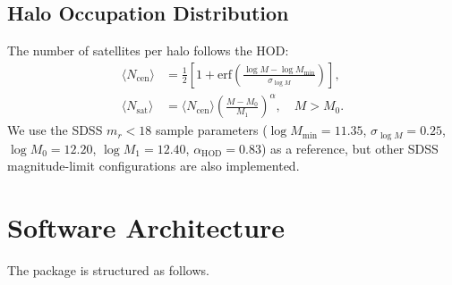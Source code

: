 \documentclass[12pt,a4paper]{article}
\begin{document}
\subsection{Halo Occupation Distribution}

The number of satellites per halo follows the \citet{Zheng2007} HOD:
\begin{align}
  \langle N_\mathrm{cen}\rangle &= \frac{1}{2}\left[1+\mathrm{erf}\!\left(\frac{\log M - \log M_\mathrm{min}}{\sigma_{\log M}}\right)\right], \label{eq:HOD_cen}\\
  \langle N_\mathrm{sat}\rangle &= \langle N_\mathrm{cen}\rangle\left(\frac{M-M_0}{M_1}\right)^\alpha,\quad M>M_0. \label{eq:HOD_sat}
\end{align}
We use the SDSS $m_r<18$ sample parameters
($\log M_\mathrm{min}=11.35$, $\sigma_{\log M}=0.25$, $\log M_0=12.20$,
$\log M_1=12.40$, $\alpha_\mathrm{HOD}=0.83$) as a reference, but other SDSS
magnitude-limit configurations are also implemented.

\section{Software Architecture}
\label{sec:software}

The package is structured as follows.
\end{document}
